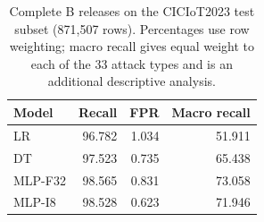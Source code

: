 \begin{table}[!htbp]

\color{RevisionBlue}
\captionsetup{font+=revisionblue}
\caption{Complete B releases on the CICIoT2023 test subset (871,507 rows). Percentages use row weighting; macro recall gives equal weight to each of the 33 attack types and is an additional descriptive analysis.}\label{tab:cic-summary}
\centering\small
\begin{tabular}{lrrr}
\toprule Model & Recall & FPR & Macro recall\\
\midrule
LR & 96.782 & 1.034 & 51.911\\
DT & 97.523 & 0.735 & 65.438\\
MLP-F32 & 98.565 & 0.831 & 73.058\\
MLP-I8 & 98.528 & 0.623 & 71.946\\
\bottomrule\end{tabular}

\end{table}
